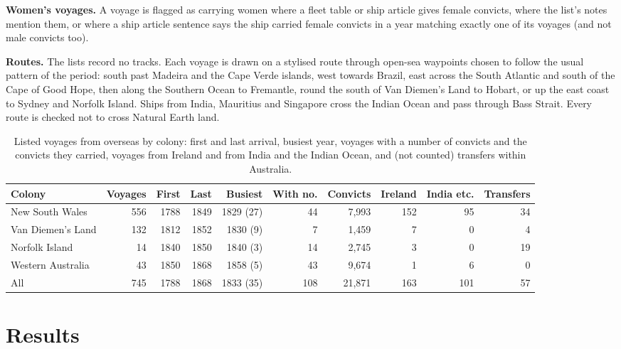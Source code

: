 \documentclass[11pt,a4paper]{article}
\begin{document}
\textbf{Women's voyages.} A voyage is flagged as carrying women where a fleet table or ship article gives female convicts, where the list's notes mention them, or where a ship article sentence says the ship carried female convicts in a year matching exactly one of its voyages (and not male convicts too).

\textbf{Routes.} The lists record no tracks. Each voyage is drawn on a stylised route through open-sea waypoints chosen to follow the usual pattern of the period: south past Madeira and the Cape Verde islands, west towards Brazil, east across the South Atlantic and south of the Cape of Good Hope, then along the Southern Ocean to Fremantle, round the south of Van Diemen's Land to Hobart, or up the east coast to Sydney and Norfolk Island. Ships from India, Mauritius and Singapore cross the Indian Ocean and pass through Bass Strait. Every route is checked not to cross Natural Earth land.

\begin{table}[tbp]\centering\footnotesize\setlength{\tabcolsep}{4pt}\caption{Listed voyages from overseas by colony: first and last arrival, busiest year, voyages with a number of convicts and the convicts they carried, voyages from Ireland and from India and the Indian Ocean, and (not counted) transfers within Australia.}\label{tab:colonies}\begin{tabular}{lrrrrrrrrr}\toprule Colony & Voyages & First & Last & Busiest & With no. & Convicts & Ireland & India etc. & Transfers\\\midrule
New South Wales & 556 & 1788 & 1849 & 1829 (27) & 44 & 7,993 & 152 & 95 & 34\\
Van Diemen's Land & 132 & 1812 & 1852 & 1830 (9) & 7 & 1,459 & 7 & 0 & 4\\
Norfolk Island & 14 & 1840 & 1850 & 1840 (3) & 14 & 2,745 & 3 & 0 & 19\\
Western Australia & 43 & 1850 & 1868 & 1858 (5) & 43 & 9,674 & 1 & 6 & 0\\
\midrule All & 745 & 1788 & 1868 & 1833 (35) & 108 & 21,871 & 163 & 101 & 57\\
\bottomrule\end{tabular}\end{table}

\section{Results}
\end{document}
